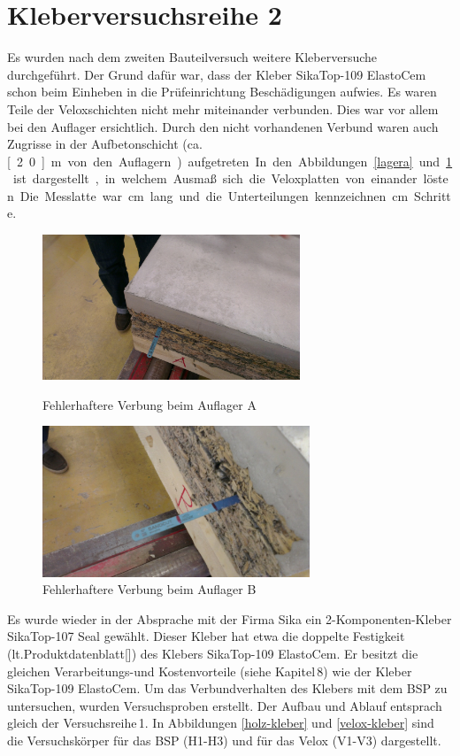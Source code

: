 \section{Kleberversuchsreihe 2}

Es wurden nach dem zweiten Bauteilversuch weitere Kleberversuche durchgeführt. Der Grund dafür war, dass der Kleber SikaTop-109 ElastoCem schon beim Einheben in die Prüfeinrichtung Beschädigungen aufwies. Es waren Teile der Veloxschichten nicht mehr miteinander verbunden. Dies war vor allem bei den Auflager ersichtlich. Durch den nicht vorhandenen Verbund waren auch Zugrisse in der Aufbetonschicht (ca. \unit[2.0]{m} von den Auflagern) aufgetreten. In den Abbildungen \ref{lagera} und \ref{lagerb} ist dargestellt, in welchem Ausmaß sich die Veloxplatten von einander lösten. Die Messlatte war \unit[30]{cm} lang und die Unterteilungen kennzeichnen \unit[5]{cm} Schritte.  

\begin{figure} [h]
\begin{minipage}[hbt]{7cm}	
	\includegraphics[width=7.7cm]{Verbindungsmittel/kleber/lagera.jpg}
	\caption{Fehlerhaftere Verbung beim Auflager A}
	\label{lagera}
\end{minipage}
\hfill
\begin{minipage}[hbt]{7cm}
	\includegraphics[width=8cm]{Verbindungsmittel/kleber/lagerb.jpg}
	\caption{Fehlerhaftere Verbung beim Auflager B}
	\label{lagerb}
\end{minipage}
\end{figure}



Es wurde wieder in der Absprache mit der Firma Sika ein  2-Komponenten-Kleber  SikaTop-107 Seal gewählt. Dieser Kleber hat etwa die doppelte Festigkeit (lt.Produktdatenblatt[]) des Klebers SikaTop-109 ElastoCem. Er besitzt die gleichen Verarbeitungs-und Kostenvorteile (siehe Kapitel\,8) wie der Kleber SikaTop-109 ElastoCem. Um das Verbundverhalten des Klebers mit dem BSP zu untersuchen, wurden Versuchsproben erstellt. Der Aufbau und Ablauf entsprach gleich der Versuchsreihe\,1.
In Abbildungen \ref{holz-kleber} und \ref{velox-kleber} sind die Versuchskörper für das BSP (H1-H3) und für das Velox (V1-V3) dargestellt.


